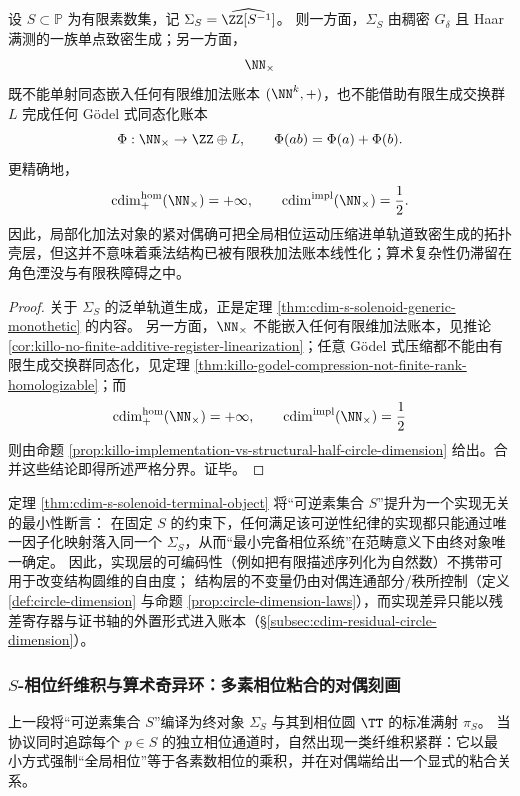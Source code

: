 \begin{corollary}[单轨道致密生成与有限加法账本障碍的严格分界]\label{cor:cdim-solenoid-versus-finite-additive-linearization}
设 \(S\subset\mathbb P\) 为有限素数集，记 \(\Sigma_S=\widehat{\ZZ[S^{-1}]}\)。
则一方面，\(\Sigma_S\) 由稠密 \(G_\delta\) 且 Haar 满测的一族单点致密生成；另一方面，
\[
\NN_{\times}
\]
既不能单射同态嵌入任何有限维加法账本 \((\NN^k,+)\)，也不能借助有限生成交换群 \(L\) 完成任何 Gödel 式同态化账本
\[
\Phi:\NN_{\times}\to \ZZ\oplus L,
\qquad
\Phi(ab)=\Phi(a)+\Phi(b).
\]
更精确地，
\[
\cdim^{\mathrm{hom}}_{+}(\NN_{\times})=+\infty,
\qquad
\cdim^{\mathrm{impl}}(\NN_{\times})=\frac12.
\]
因此，局部化加法对象的紧对偶确可把全局相位运动压缩进单轨道致密生成的拓扑壳层，但这并不意味着乘法结构已被有限秩加法账本线性化；算术复杂性仍滞留在角色湮没与有限秩障碍之中。
\end{corollary}
\begin{proof}
关于 \(\Sigma_S\) 的泛单轨道生成，正是定理 \ref{thm:cdim-s-solenoid-generic-monothetic} 的内容。
另一方面，\(\NN_{\times}\) 不能嵌入任何有限维加法账本，见推论 \ref{cor:killo-no-finite-additive-register-linearization}；任意 Gödel 式压缩都不能由有限生成交换群同态化，见定理 \ref{thm:killo-godel-compression-not-finite-rank-homologizable}；而
\[
\cdim^{\mathrm{hom}}_{+}(\NN_{\times})=+\infty,
\qquad
\cdim^{\mathrm{impl}}(\NN_{\times})=\frac12
\]
则由命题 \ref{prop:killo-implementation-vs-structural-half-circle-dimension} 给出。合并这些结论即得所述严格分界。证毕。
\end{proof}

\begin{remark}[实现层编码与结构圆维的严格分离]\label{rem:cdim-solenoid-terminal-separation}
定理 \ref{thm:cdim-s-solenoid-terminal-object} 将“可逆素集合 \(S\)”提升为一个实现无关的最小性断言：
在固定 \(S\) 的约束下，任何满足该可逆性纪律的实现都只能通过唯一因子化映射落入同一个 \(\Sigma_S\)，从而“最小完备相位系统”在范畴意义下由终对象唯一确定。
因此，实现层的可编码性（例如把有限描述序列化为自然数）不携带可用于改变结构圆维的自由度；
结构层的不变量仍由对偶连通部分/秩所控制（定义 \ref{def:circle-dimension} 与命题 \ref{prop:circle-dimension-laws}），而实现差异只能以残差寄存器与证书轴的外置形式进入账本（\S\ref{subsec:cdim-residual-circle-dimension}）。
\end{remark}



\subsubsection{\texorpdfstring{$S$}{S}-相位纤维积与算术奇异环：多素相位粘合的对偶刻画}\label{subsubsec:cdim-solenoid-arithmetic-singular-ring}
上一段将“可逆素集合 \(S\)”编译为终对象 \(\Sigma_S\) 与其到相位圆 \(\TT\) 的标准满射 \(\pi_S\)。
当协议同时追踪每个 \(p\in S\) 的独立相位通道时，自然出现一类纤维积紧群：它以最小方式强制“全局相位”等于各素数相位的乘积，并在对偶端给出一个显式的粘合关系。

